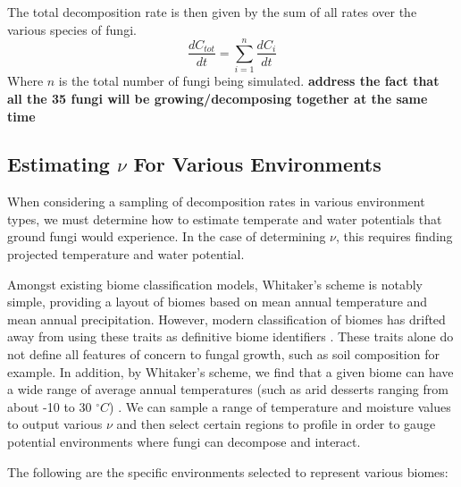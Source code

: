 \documentclass[12pt]{article}
\begin{document}
\begin{multicols}{2}
The total decomposition rate is then given by the sum of all rates over the various species of fungi.
\begin{equation} \label{eq}
\frac{dC_{tot}}{dt} = \sum_{i=1}^{n}\frac{dC_{i}}{dt}
\end{equation}
Where $n$ is the total number of fungi being simulated. \textbf{address the fact that all the 35 fungi will be growing/decomposing together at the same time}

\subsection{Estimating $\nu$ For Various Environments}

When considering a sampling of decomposition rates in various environment types, we must determine how to estimate temperate and water potentials that ground fungi would experience. In the case of determining $\nu$, this requires finding projected temperature and water potential.

Amongst existing biome classification models, Whitaker's scheme \cite{Whittaker1970} is notably simple, providing a layout of biomes based on mean annual temperature and mean annual precipitation. However, modern classification of biomes has drifted away from using these traits as definitive biome identifiers \cite{Mucina2018}. These traits alone do not define all features of concern to fungal growth, such as soil composition for example. In addition, by Whitaker's scheme, we find that a given biome can have a wide range of average annual temperatures (such as arid desserts ranging from about -10 to 30 $^{\circ}C$) \cite{Whittaker1970}. We can sample a range of temperature and moisture values to output various $\nu$ and then select certain regions to profile in order to gauge potential environments where fungi can decompose and interact.

The following are the specific environments selected to represent various biomes:

\end{multicols}
\end{document}
